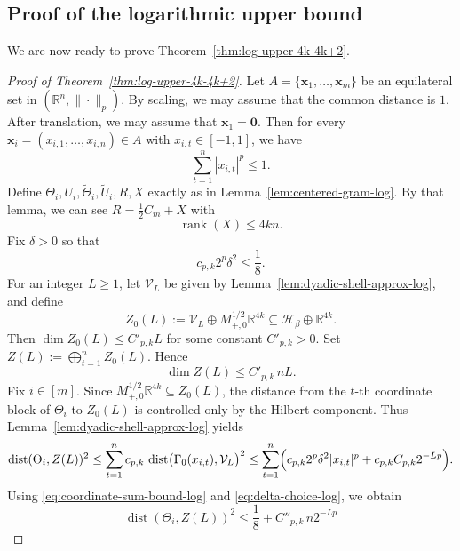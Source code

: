 \documentclass[11pt]{article}
\theoremstyle{definition}
\begin{document}
\subsection{Proof of the logarithmic upper bound}

We are now ready to prove Theorem~\ref{thm:log-upper-4k-4k+2}.

\begin{proof}[Proof of Theorem~\ref{thm:log-upper-4k-4k+2}]
Let
\(
A=\{\boldsymbol{x}_1,\dots,\boldsymbol{x}_m\}
\)
be an equilateral set in $(\mathbb R^n,\|\cdot\|_p)$. By scaling, we may assume that the common distance is $1$.
After translation, we may assume that
\(
\boldsymbol{x}_1=\boldsymbol{0}.
\)
Then for every $\boldsymbol{x}_i=(x_{i,1},\dots,x_{i,n})\in A$ with \(x_{i,t}\in[-1,1]\), we have
\begin{equation}\label{eq:coordinate-sum-bound-log}
\sum_{t=1}^n |x_{i,t}|^p\le 1.
\end{equation}
Define $\Theta_i,U_i,\widetilde\Theta_i,\widetilde U_i,R,X$ exactly as in
Lemma~\ref{lem:centered-gram-log}. By that lemma, we can see \(R=\frac12 C_m+X\) with
\begin{equation}\label{eq:gram-decomposition-log}
\operatorname{rank}(X)\le 4kn.
\end{equation}
Fix $\delta>0$ so that
\begin{equation}\label{eq:delta-choice-log}
c_{p,k}2^p\delta^2\le \frac18.
\end{equation}
For an integer $L\ge 1$, let $\mathcal V_L$ be given by
Lemma~\ref{lem:dyadic-shell-approx-log}, and define
\[
Z_0(L):=
\mathcal V_L \oplus M_{+,0}^{1/2}\mathbb R^{4k}
\subseteq
\mathcal H_\beta\oplus\mathbb R^{4k}.
\]
Then
\(
\dim Z_0(L)\le C'_{p,k}L
\)
for some constant $C'_{p,k}>0$. Set
\(
Z(L):=\bigoplus_{t=1}^n Z_0(L).
\)
Hence
\begin{equation}\label{eq:dim-ZL-log}
\dim Z(L)\le C'_{p,k}\,nL.
\end{equation}
Fix $i\in[m]$. Since $M_{+,0}^{1/2}\mathbb R^{4k}\subseteq Z_0(L)$, the distance from the
$t$-th coordinate block of $\Theta_i$ to $Z_0(L)$ is controlled only by the Hilbert
component. Thus Lemma~\ref{lem:dyadic-shell-approx-log} yields
\[
\operatorname{dist}(\Theta_i,Z(L))^2
\le
\sum_{t=1}^n
c_{p,k}\,\operatorname{dist}\bigl(\Gamma_0(x_{i,t}),\mathcal V_L\bigr)^2\le
\sum_{t=1}^n
\Bigl(
c_{p,k}2^p\delta^2 |x_{i,t}|^p + c_{p,k}C_{p,k}2^{-Lp}
\Bigr).
\]
Using \eqref{eq:coordinate-sum-bound-log} and \eqref{eq:delta-choice-log}, we obtain
\[
\operatorname{dist}(\Theta_i,Z(L))^2
\le
\frac18 + C''_{p,k}\,n2^{-Lp}
\]
\end{proof}
\end{document}
